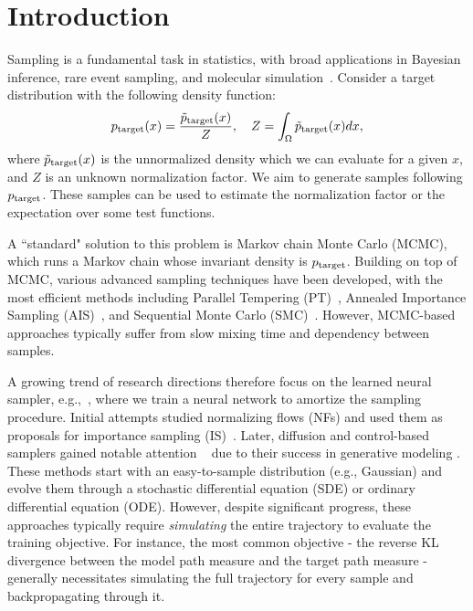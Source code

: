 

\section{Introduction}
Sampling is a fundamental task in statistics, with broad applications in Bayesian inference, rare event sampling, and molecular simulation~\citep{box2011bayesian,tuckerman2023statistical,dellago2002transition,dudoob}.
Consider a target distribution with the following density function:
\begin{equation}
p_\text{target}(x) = \frac{\tilde{p}_\text{target}(x)}{Z}, \quad Z = \int_{\Omega} \tilde{p}_\text{target}(x) dx,
\end{equation}
where $\tilde{p}_\text{target}(x)$ is the unnormalized density which we can evaluate for a given $x$, and $Z$ is an unknown normalization factor.
We aim to generate samples following $p_\text{target}$.
These samples can be used to estimate the normalization factor or the expectation over some test functions.
\par
A ``standard" solution to this problem is Markov chain Monte Carlo (MCMC), which runs a Markov chain whose invariant density is $p_\text{target}$. 
Building on top of MCMC, various advanced sampling techniques have been developed, with the most efficient methods including Parallel Tempering (PT)~\citep{swendsen1986replica,earl2005parallel}, Annealed Importance Sampling (AIS)~\citep{neal2001annealed}, and Sequential Monte Carlo (SMC)~\citep{doucet2001introduction}.
However, MCMC-based approaches typically suffer from slow mixing time and dependency between samples. 
\par
A growing trend of research directions therefore focus on the learned neural sampler, e.g.,~\citep{noe2019boltzmann}, where we train a neural network to amortize the sampling procedure. 
Initial attempts studied normalizing flows (NFs) and used them as proposals for importance sampling (IS)~\citep{noe2019boltzmann,midgleyflow}. 
Later, diffusion and control-based samplers gained notable attention ~\citep{zhangpath,doucet2022score,vargasdenoising,berneroptimal,vargas2024transport,albergo2024nets} due to their success in generative modeling \citep{ho2020denoising,songscore,karras2022elucidating}.
These methods start with an easy-to-sample distribution (e.g., Gaussian) and evolve them through a stochastic differential equation (SDE) or ordinary differential equation (ODE).
However, despite significant progress, these approaches typically require \emph{simulating} the entire trajectory to evaluate the training objective. 
For instance, the most common objective - the reverse KL divergence between the model path measure and the target path measure - generally necessitates simulating the full trajectory for every sample and backpropagating through it. 
